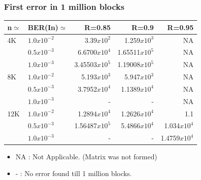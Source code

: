 \documentclass[xcolor=dvipsname]
{beamer}
\begin{document}
\begin{frame}[t] 
\frametitle{First error in 1 million blocks}

\begin{table}[]
\centering
\begin{tabular}{|l|l|r|r|r|}
\hline
n$\simeq$   & BER(In)$\simeq$    & R=0.85  & R=0.9 & R=0.95 \\ \hline
4K  & $1.0x10^{-2}$        & 3.39$x10^{2}$           & 1.259$x10^{3}$        & NA      \\ 
    & $0.5x10^{-3}$        & 6.6700$x10^{4}$        & 1.65511$x10^{5}$               & NA   \\ 
    & $1.0x10^{-3}$        & 3.45503$x10^{5}$        & 1.19008$x10^{5}$        & NA  \\ \hline
8K  & $1.0x10^{-2}$        & 5.193$x10^{3}$         & 5.947$x10^{3}$         & NA      \\ 
    & $0.5x10^{-3}$        & 3.7952$x10^{4}$        & 1.1389$x10^{4}$          & NA  \\ 
    & $1.0x10^{-3}$        & -             			& -               		 & NA             \\ \hline
12K & $1.0x10^{-2}$        & 1.2894$x10^{4}$        & 1.2626$x10^{4}$     & 1.1      \\ 
    & $0.5x10^{-3}$        & 1.56487$x10^{5}$      & 5.4866$x10^{4}$     & 1.034$x10^{4}$    \\ 
    & $1.0x10^{-3}$        & -			  			 & -           		& 1.4759$x10^{4}$   \\ \hline
      
\end{tabular}
\begin{itemize}
\item NA : Not Applicable. (Matrix was not formed)
\item -	 : No error found till 1 million blocks. 
\end{itemize}
 
\end{table}

\end{frame}

\end{document}
